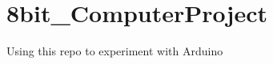 \chapter{8bit\+\_\+\+Computer\+Project }
\hypertarget{md__r_e_a_d_m_e}{}\label{md__r_e_a_d_m_e}
\label{md__r_e_a_d_m_e_autotoc_md0}%
%


Using this repo to experiment with Arduino 